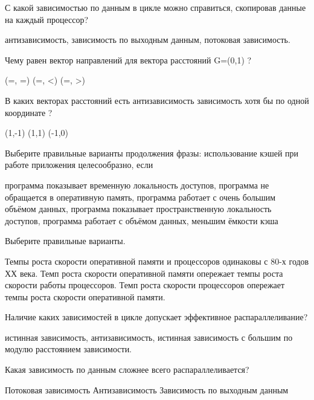 \documentclass[a4paper, 12pt, addpoints]{exam}
\begin{document}
\begin{questions}
\question[1] С какой зависимостью по данным в цикле можно справиться, скопировав данные на каждый процессор?
\begin{choices}
    \correctchoice антизависимость,
    \choice зависимость по выходным данным,
    \choice потоковая зависимость.
\end{choices}

\question[1] Чему равен вектор направлений для вектора расстояний G=(0,1) ?
\begin{choices}
    \choice (=, =)
    \correctchoice (=, <)
    \choice (=, >)
\end{choices}

\question[1] В каких векторах расстояний есть антизависимость зависимость хотя бы по одной координате ?
\begin{choices}
    \correctchoice (1,-1)
    \choice (1,1)
    \correctchoice (-1,0)
\end{choices}

\question[1] Выберите правильные варианты продолжения фразы: использование кэшей
при работе приложения целесообразно, если
\begin{choices}
    \correctchoice программа показывает временную локальность доступов,
    \choice программа не обращается в оперативную память,
    \choice программа работает с очень большим объёмом данных,
    \correctchoice программа показывает пространственную локальность доступов,
    \choice программа работает с объёмом данных, меньшим ёмкости кэша
\end{choices}

\question[1] Выберите правильные варианты.
\begin{choices}
    \choice Темпы роста скорости оперативной памяти и процессоров одинаковы с 80-х годов ХХ века.
    \choice Темп роста скорости оперативной памяти опережает темпы роста скорости работы процессоров.
    \correctchoice Темп роста скорости процессоров опережает темпы роста скорости оперативной памяти. 
\end{choices}

\question[1] Наличие каких зависимостей в цикле допускает эффективное распараллеливание?
\begin{choices}
    \choice истинная зависимость,
    \correctchoice антизависимость,
    \correctchoice истинная зависимость с большим по модулю расстоянием зависимости.
\end{choices}

\question[1] Какая зависимость по данным сложнее всего распараллеливается?
\begin{choices}
    \correctchoice Потоковая зависимость
    \choice Антизависимость
    \choice Зависимость по выходным данным
\end{choices}


\end{questions}
\end{document}
